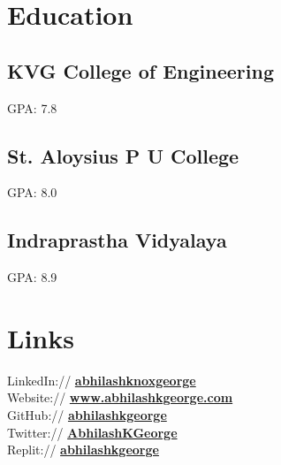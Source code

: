 \documentclass[]{deedy-resume-openfont}
\begin{document}
%
%
\lastupdated

%
%

%
%

\begin{minipage}[t]{0.33\textwidth} 


\section{Education} 

\subsection{KVG College of Engineering}
GPA: 7.8
\sectionsep

\subsection{St. Aloysius P U College}
GPA: 8.0
\sectionsep

\subsection{Indraprastha Vidyalaya}
GPA: 8.9
\sectionsep


\section{Links} 
LinkedIn://  \href{https://www.linkedin.com/in/abhilashkgeorge}{\bf abhilashknoxgeorge} \\
Website://  \href{https://www.abhilashkgeorge.com}{\bf www.abhilashkgeorge.com} \\
GitHub:// \href{https://github.com/abhilashkgeorge}{\bf abhilashkgeorge} \\
Twitter:// \href{https://twitter.com/AbsKgeorge}{\bf AbhilashKGeorge} \\
Replit:// \href{https://replit.com/@abhilashkgeorge}{\bf abhilashkgeorge} \\


\end{minipage}
\end{document}
